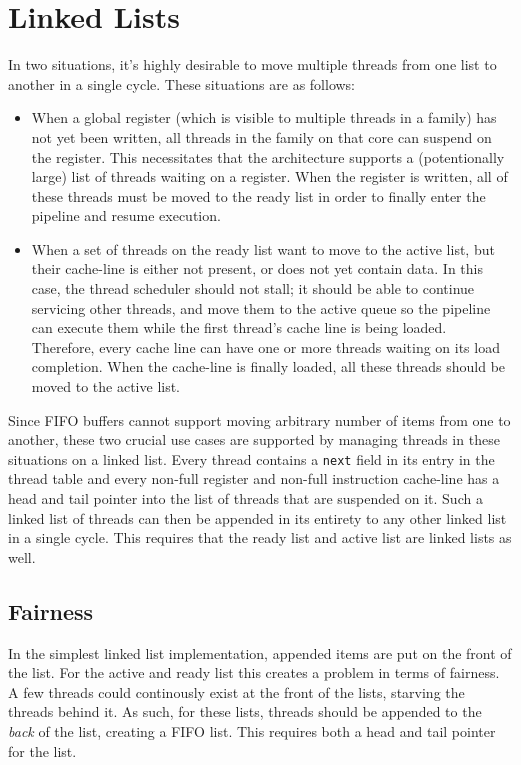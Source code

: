 \section{Linked Lists}
In two situations, it's highly desirable to move multiple threads from one list to another in a single cycle. These situations are as follows:
\begin{itemize}
\item{} When a global register (which is visible to multiple threads in a family) has not yet been written, all threads in the family on that core can suspend on the register. This necessitates that the architecture supports a (potentionally large) list of threads waiting on a register. When the register is written, all of these threads must be moved to the ready list in order to finally enter the pipeline and resume execution.
\item{} When a set of threads on the ready list want to move to the active list, but their cache-line is either not present, or does not yet contain data. In this case, the thread scheduler should not stall; it should be able to continue servicing other threads, and move them to the active queue so the pipeline can execute them while the first thread's cache line is being loaded. Therefore, every cache line can have one or more threads waiting on its load completion. When the cache-line is finally loaded, all these threads should be moved to the active list.
\end{itemize}
Since FIFO buffers cannot support moving arbitrary number of items from one to another, these two crucial use cases are supported by managing threads in these situations on a linked list. Every thread contains a {\tt next} field in its entry in the thread table and every non-full register and non-full instruction cache-line has a head and tail pointer into the list of threads that are suspended on it. Such a linked list of threads can then be appended in its entirety to any other linked list in a single cycle. This requires that the ready list and active list are linked lists as well.

\subsection{Fairness}
\label{sec:fairness}
In the simplest linked list implementation, appended items are put on the front of the list. For the active and ready list this creates a problem in terms of fairness. A few threads could continously exist at the front of the lists, starving the threads behind it. As such, for these lists, threads should be appended to the \emph{back} of the list, creating a FIFO list. This requires both a head and tail pointer for the list. 

